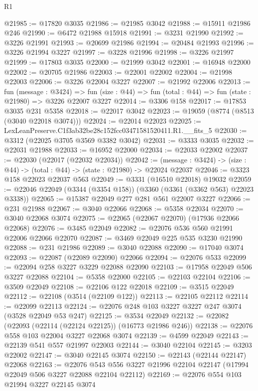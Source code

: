 \begin{lexlean}{R1}
\begin{coremodule}
@21985 := @17820 @3035
@21986 := @21985 @3042
@21988 := @15911 @21986 @246
@21990 := @6472 @21988 @15918
@21991 := @3231 @21990
@21992 := @3226 @21991
@21993 := @20699 @21986
@21994 := @20484 @21993
@21996 := @3226 @21994 @3227
@21997 := @3228 @21996
@21998 := @3226 @21997
@21999 := @17803 @3035
@22000 := @21999 @3042
@22001 := @16948 @22000
@22002 := @20705 @21986
@22003 := @22001 @22002
@22004 := @21998 @22003
@22006 := @3226 @22004 @3227
@22007 := @21992 @22006
@22013 := fun (message : @3424) =>
  fun (size : @44) => fun (total : @44) => fun (state : @21980) => @3226 @22007 @3227
@22014 := @3306 @158
@22017 := @17853 @3035 @231 @5358
@22018 := @22017 @3042
@22023 := @19059 (@8774 (@8513 (@3040 @22018 @3074)))
@22024 := @22014 @22023
@22025 := LexLeanPreserve.C1f3ab32be28c152fcc03471581520411.R1.__fits_5
@22030 := @3312 (@22025 @3705 @3569 @3382 @3042)
@22031 := @3333 @3035
@22032 := @22031 @21988
@22033 := @16952 @22000
@22034 := @22033 @22002
@22037 := @22030 (@22017 (@22032 @22034))
@22042 := (message : @3424) -> (size : @44) -> (total : @44) -> (state : @21980) -> @22024 @22037
@22046 := @3323 @158 @22023 @22037 @563
@22049 := @3331 (@16510 @22018) @19032
@22059 := @22046 @22049 (@3344 (@3354 @158)) (@3360 (@3361 (@3362 @563) @22023 @3338))
@22065 := @15387 @22049 @277 @281 @561 @22007 @3227
@22066 := @231 @21988
@22067 := @3040 @22066
@22068 := @5358 @22034
@22070 := @3040 @22068 @3074
@22075 := @22065 (@22067 @22070) (@17936 @22066 @22068)
@22076 := @3485 @22049
@22082 := @22076 @536 @560 @21991 @22006 @22066 @22070
@22087 := @3469 @22049 @225 @535 @3230 @21990
@22088 := @231 @21986
@22089 := @3040 @22088
@22090 := @17040 @3074
@22093 := @22087 (@22089 @22090) @22066
@22094 := @22076 @533
@22099 := @22094 @258 @3227 @3229 @22088 @22090
@22103 := @17958 @22049 @506 @3227 @22088
@22104 := @5358 @22000
@22105 := @22103 @22104
@22106 := @3509 @22049
@22108 := @22106 @122 @22018
@22109 := @3515 @22049
@22112 := @22108 (@3514 (@22109 @122))
@22113 := @22105 @22112
@22114 := @22099 @22113
@22124 := @22076 @248 @103 @3227 @3227 @247 @3074 (@3528 @22049 @53 @247)
@22125 := @3534 @22049
@22132 := @22082 (@22093 (@22114 (@22124 @22125)) (@16773 @21986 @246))
@22138 := @22076 @558 @103 @22004 @3227 @22068 @3074
@22139 := @4599 @22049
@22143 := @22139 @541 @557 @21997 @22003
@22144 := @3040 @22104
@22145 := @3203 @22002
@22147 := @3040 @22145 @3074
@22150 := @22143 (@22144 @22147) @22068
@22163 := @22076
    @543
    @556
    @3227
    @21996
    @22104
    @22147
    (@17994 @22049 @506 @3227 @22088 @22104 @22112)
@22169 := @22076 @554 @103 @21994 @3227 @22145 @3074

\end{coremodule}
\end{lexlean}
